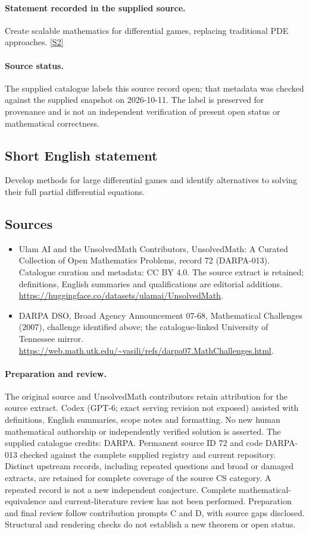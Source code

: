 \documentclass[11pt]{article}
\begin{document}
\paragraph{Statement recorded in the supplied source.}
Create scalable mathematics for differential games, replacing traditional PDE approaches. \href{https://web.math.utk.edu/~vasili/refs/darpa07.MathChallenges.html}{[S2]}
\paragraph{Source status.}
The supplied catalogue labels this source record open; that metadata was checked against the supplied snapshot on 2026-10-11. The label is preserved for provenance and is not an independent verification of present open status or mathematical correctness.
\subsection{Short English statement}
Develop methods for large differential games and identify alternatives to solving their full partial differential equations.
\subsection{Sources}
\begin{itemize}
\item[S1] Ulam AI and the UnsolvedMath Contributors, UnsolvedMath: A Curated Collection of Open Mathematics Problems, record 72 (DARPA-013). Catalogue curation and metadata: CC BY 4.0. The source extract is retained; definitions, English summaries and qualifications are editorial additions.
\url{https://huggingface.co/datasets/ulamai/UnsolvedMath}.
\item[S2] DARPA DSO, Broad Agency Announcement 07-68, Mathematical Challenges (2007), challenge identified above; the catalogue-linked University of Tennessee mirror.
\url{https://web.math.utk.edu/~vasili/refs/darpa07.MathChallenges.html}.
\end{itemize}
\paragraph{Preparation and review.}
The original source and UnsolvedMath contributors retain attribution for the source extract. Codex (GPT-6; exact serving revision not exposed) assisted with definitions, English summaries, scope notes and formatting. No new human mathematical authorship or independently verified solution is asserted. The supplied catalogue credits: DARPA. Permanent source ID 72 and code DARPA-013 checked against the complete supplied registry and current repository. Distinct upstream records, including repeated questions and broad or damaged extracts, are retained for complete coverage of the source CS category. A repeated record is not a new independent conjecture. Complete mathematical-equivalence and current-literature review has not been performed. Preparation and final review follow contribution prompts C and D, with source gaps disclosed. Structural and rendering checks do not establish a new theorem or open status.
\label{end:72}
\end{document}
